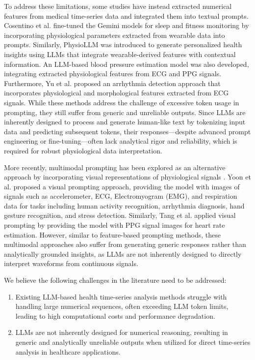 To address these limitations, some studies have instead extracted numerical features from medical time-series data and integrated them into textual prompts. Cosentino et al. \cite{cosentino2024towards} fine-tuned the Gemini models \cite{team2023gemini} for sleep and fitness monitoring by incorporating physiological parameters extracted from wearable data into prompts. Similarly, PhysioLLM \cite{fang2024physiollm} was introduced to generate personalized health insights using LLMs that integrate wearable-derived features with contextual information. An LLM-based blood pressure estimation model \cite{liu2024large} was also developed, integrating extracted physiological features from ECG and PPG signals. Furthermore, Yu et al. \cite{yu2023zero} proposed an arrhythmia detection approach that incorporates physiological and morphological features extracted from ECG signals. While these methods address the challenge of excessive token usage in prompting, they still suffer from generic and unreliable outputs. Since LLMs are inherently designed to process and generate human-like text by tokenizing input data and predicting subsequent tokens, their responses—despite advanced prompt engineering or fine-tuning—often lack analytical rigor and reliability, which is required for robust physiological data interpretation.

More recently, multimodal prompting has been explored as an alternative approach by incorporating visual representations of physiological signals \cite{yoon2024my, tang2023alpha}. Yoon et al. \cite{yoon2024my} proposed a visual prompting approach, providing the model with images of signals such as accelerometer, ECG, Electromyogram (EMG), and respiration data for tasks including human activity recognition, arrhythmia diagnosis, hand gesture recognition, and stress detection. Similarly, Tang et al. \cite{tang2023alpha} applied visual prompting by providing the model with PPG signal images for heart rate estimation. However, similar to feature-based prompting methods, these multimodal approaches also suffer from generating generic responses rather than analytically grounded insights, as LLMs are not inherently designed to directly interpret waveforms from continuous signals.

We believe the following challenges in the literature need to be addressed:
\begin{enumerate}
    \item Existing LLM-based health time-series analysis methods struggle with handling large numerical sequences, often exceeding LLM token limits, leading to high computational costs and performance degradation.
    \item LLMs are not inherently designed for numerical reasoning, resulting in generic and analytically unreliable outputs when utilized for direct time-series analysis in healthcare applications.
\end{enumerate}




